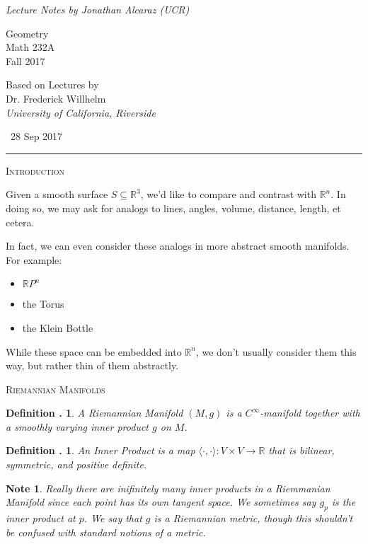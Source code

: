 \documentclass[twoside]{report}
\newcommand{\R}{\mathbb{R}}
\newcommand{\cleanbr}{\vspace{1ex}\noindent}
\newcounter{Lecture}
\newcommand{\newLec}[1]{
  \stepcounter{Lecture}
  \noindent{\Large\bf Lecture \arabic{Lecture}} \, #1 \hfill  \rule[1ex]{2.5in}{.1pt} \vspace{1em}
}
\theoremstyle{myts}
\newcounter{c}[Lecture]
\newtheorem{dfn}[c]{Definition \arabic{Lecture}.}
\newtheorem*{nte}{Note}
\newcounter{ex}[Lecture]
\begin{document}
\begin{titlepage}
  \centering
  {\it Lecture Notes by Jonathan Alcaraz (UCR)} \\
  
  \vfill
  
  {\Huge Geometry} \\
  \vspace{1em}
  {Math 232A} \\
  {Fall 2017} \\

  \vfill
  
  {Based on Lectures by} \\
  \vspace{1em}
  {\Large Dr. Frederick Willhelm} \\
  {\it University of California, Riverside}
  
  \vfill
\end{titlepage}
\setcounter{page}{1}


\newLec{28 Sep 2017}

\noindent
{\large\scshape Introduction}

\cleanbr
  Given a smooth surface \( S \subseteq \R^3 \), we'd like to compare and contrast with \( \R^n\). In doing so, we may ask for analogs to lines, angles, volume, distance, length, et cetera.

\cleanbr
In fact, we can even consider these analogs in more abstract smooth manifolds. For example:
\begin{itemize}
  \item \(\R P^n\)
  \item the Torus
  \item the Klein Bottle
\end{itemize}

\cleanbr
While these space can be embedded into $\R^n$, we don't usually consider them this way, but rather thin of them abstractly.

\cleanbr
{\large\scshape Riemannian Manifolds}

\begin{dfn}
  A \emph{Riemannian Manifold} \( (M, g)\) is a \(C^\infty\)-manifold together with a smoothly varying inner product $g$ on $M$.
\end{dfn}

\begin{dfn}
  An \emph{Inner Product} is a map \( \langle \cdot , \cdot \rangle : V \times V \to \R \) that is bilinear, symmetric, and positive definite.
\end{dfn}

\begin{nte}
  Really there are inifinitely many inner products in a Riemmanian Manifold since each point has its own tangent space. We sometimes say $g_p$ is the inner product at $p$. We say that $g$ is a \emph{Riemannian metric}, though this shouldn't be confused with standard notions of a metric.
\end{nte}
\end{document}
